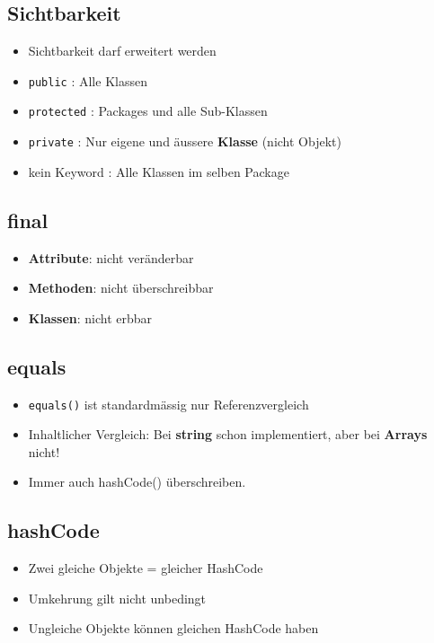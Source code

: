 \begin{multicols*}{5}
	\subsection{Sichtbarkeit}
		\begin{itemize}
			\item Sichtbarkeit darf erweitert werden
			\item \tiny \textcolor{b}{\texttt{public}}
				\footnotesize : Alle Klassen
			\item \tiny \textcolor{b}{\texttt{protected}}
				\footnotesize : Packages und alle Sub-Klassen
			\item \tiny \textcolor{b}{\texttt{private}}
				\footnotesize : Nur eigene und äussere \textbf{Klasse} (nicht Objekt)
			\item \tiny kein Keyword
				\footnotesize : Alle Klassen im selben Package
		\end{itemize}
	
	
	\subsection{final}
		\begin{itemize}
			\item \textbf{Attribute}: nicht veränderbar
			\item \textbf{Methoden}: nicht überschreibbar
			\item \textbf{Klassen}: nicht erbbar
		\end{itemize}
	
	\subsection{equals}
		\begin{itemize}
			\item \tiny \textcolor{b}{\texttt{equals()}} 
				\footnotesize ist standardmässig nur Referenzvergleich
			\item Inhaltlicher Vergleich: Bei \textbf{string} schon implementiert, 
			aber bei \textbf{Arrays} nicht!
			\item Immer auch hashCode() überschreiben.
		\end{itemize}
	
	\subsection{hashCode}
		\begin{itemize}
			\item Zwei gleiche Objekte = gleicher HashCode
			\item Umkehrung gilt nicht unbedingt
			\item Ungleiche Objekte können gleichen HashCode haben
		\end{itemize}
	


\end{multicols*}
